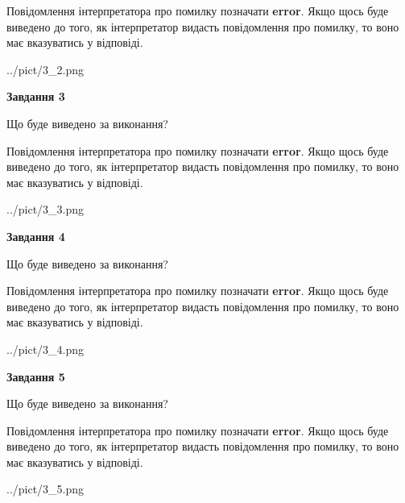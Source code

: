 \documentclass[12pt, ukrainian]{article}
\begin{document}
{\begin {large}
Повідомлення інтерпретатора про помилку позначати \textbf{error}.
Якщо щось буде виведено до того, як інтерпретатор видасть повідомлення про помилку, 
то воно має вказуватись у відповіді. \par


\begin{center}
	{../pict/3_2.png}
\end{center}
\newpage

{\begin {center}\textbf{Завдання 3}\end {center}}\par
Що буде виведено за виконання?

Повідомлення інтерпретатора про помилку позначати \textbf{error}.
Якщо щось буде виведено до того, як інтерпретатор видасть повідомлення про помилку, 
то воно має вказуватись у відповіді. \par


\begin{center}
	{../pict/3_3.png}
\end{center}
\newpage

{\begin {center}\textbf{Завдання 4}\end {center}}\par
Що буде виведено за виконання?

Повідомлення інтерпретатора про помилку позначати \textbf{error}.
Якщо щось буде виведено до того, як інтерпретатор видасть повідомлення про помилку, 
то воно має вказуватись у відповіді. \par


\begin{center}
	{../pict/3_4.png}
\end{center}
\newpage

{\begin {center}\textbf{Завдання 5}\end {center}}\par
Що буде виведено за виконання?

Повідомлення інтерпретатора про помилку позначати \textbf{error}.
Якщо щось буде виведено до того, як інтерпретатор видасть повідомлення про помилку, 
то воно має вказуватись у відповіді. \par


\begin{center}
	{../pict/3_5.png}
\end{center}
\newpage


\end{large}}
\end{document}
